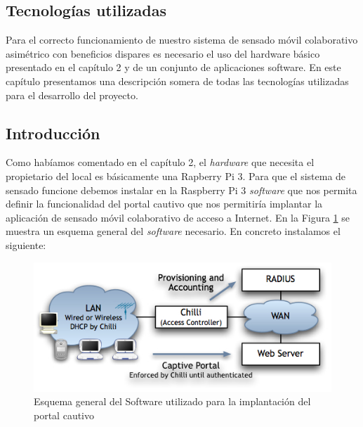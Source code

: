 \clearpage
{}%
\begin{center}
\begin{minipage}{.75\textwidth}
\section{Tecnologías utilizadas}

Para el correcto funcionamiento de nuestro sistema de sensado móvil colaborativo asimétrico con beneficios dispares es necesario el uso del hardware básico presentado en el capítulo 2 y de un conjunto de aplicaciones software. En este capítulo presentamos una descripción somera de todas las tecnologías utilizadas para el desarrollo del proyecto. %
\end{minipage}
\end{center}
\clearpage%

\subsection{Introducción}
Como habíamos comentado en el capítulo 2, el \emph{hardware} que necesita el propietario del local es básicamente una Rapberry Pi 3. Para que el sistema de sensado funcione debemos instalar en la Raspberry Pi 3 \emph{software} que nos permita definir la funcionalidad del portal cautivo que nos permitiría implantar la aplicación de sensado móvil colaborativo de acceso a Internet. En la Figura \ref{CoovaScheme} se muestra un esquema general del \emph{software} necesario. En concreto instalamos el siguiente:

\begin{figure}[!t]
\begin{center}
\includegraphics[width=0.75\linewidth]{./3_Tecnologias/Img/CoovaScheme.jpg}
\end{center}
\caption{Esquema general del Software utilizado para la implantación del portal cautivo}
\label{CoovaScheme}
\end{figure}

